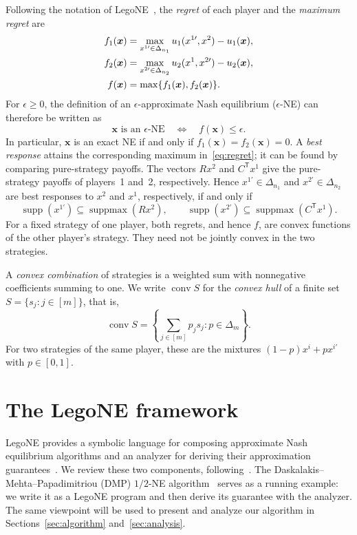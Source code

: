 \documentclass[11pt]{article}
\theoremstyle{remark}
\theoremstyle{plain}
\newcommand{\conv}{\operatorname{conv}}
\DeclareMathOperator{\supp}{supp}
\DeclareMathOperator{\suppmax}{suppmax}
\begin{document}
Following the notation of LegoNE~\cite{legone2026}, the \emph{regret} of
each player and the \emph{maximum regret} are
\begin{align}
 f_1(\boldsymbol{x})
 &=\max_{x^{1\prime}\in\Delta_{n_1}}u_1(x^{1\prime},x^2)-u_1(\boldsymbol{x}),\notag\\
 f_2(\boldsymbol{x})
 &=\max_{x^{2\prime}\in\Delta_{n_2}}u_2(x^1,x^{2\prime})-u_2(\boldsymbol{x}),\notag\\
 f(\boldsymbol{x})&=\max\{f_1(\boldsymbol{x}),f_2(\boldsymbol{x})\}.
 \label{eq:regret}
\end{align}
For $\epsilon\ge0$, the definition of an $\epsilon$-approximate Nash
equilibrium ($\epsilon$-NE) can therefore be written as
\[
 \boldsymbol{x}\text{ is an }\epsilon\text{-NE}
 \quad\Longleftrightarrow\quad f(\boldsymbol{x})\le\epsilon.
\]
In particular, $\boldsymbol{x}$ is an exact NE if and only if
$f_1(\boldsymbol{x})=f_2(\boldsymbol{x})=0$.
A \emph{best response} attains the corresponding maximum
in~\eqref{eq:regret}; it can be found by comparing pure-strategy payoffs.
The vectors $Rx^2$ and $C^{\mathsf T}x^1$ give the pure-strategy
payoffs of players~1 and~2, respectively. Hence $x^{1\prime}\in\Delta_{n_1}$
and $x^{2\prime}\in\Delta_{n_2}$ are best responses to $x^2$ and $x^1$,
respectively, if and only if
\[
 \supp(x^{1\prime})\subseteq\suppmax(Rx^2),
 \qquad
 \supp(x^{2\prime})\subseteq\suppmax(C^{\mathsf T}x^1).
\]
For a fixed strategy of one player, both regrets, and hence $f$, are
convex functions of the other player's strategy. They need not be jointly convex in the two strategies.

A \emph{convex combination} of strategies is a weighted sum with
nonnegative coefficients summing to one. We write $\conv S$ for the
\emph{convex hull} of a finite set $S=\{s_j:j\in[m]\}$, that is,
\[
 \conv S=\left\{\sum_{j\in[m]}p_j s_j:p\in\Delta_m\right\}.
\]
For two strategies of the same player, these are the mixtures
$(1-p)x^i+p x^{i\prime}$ with $p\in[0,1]$.

\section{The LegoNE framework}
\label{sec:legone-review}

LegoNE provides a symbolic language for composing approximate Nash
equilibrium algorithms and an analyzer for deriving their approximation
guarantees~\cite{legone2026,computeraided2026}. We review these two
components, following~\cite{legone2026}. The
Daskalakis--Mehta--Papadimitriou (DMP) $1/2$-NE
algorithm~\cite{daskalakisnote2009} serves as a running example: we
write it as a LegoNE program and then derive its guarantee with the
analyzer. The same viewpoint will be used to
present and analyze our algorithm in Sections~\ref{sec:algorithm}
and~\ref{sec:analysis}.
\end{document}
